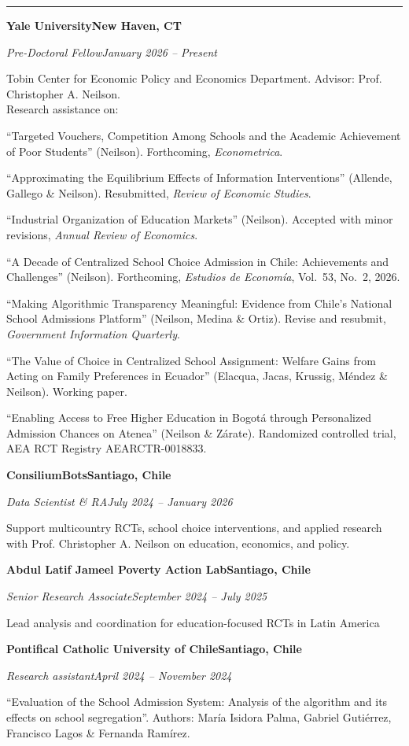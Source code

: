 \documentclass[11pt]{article}
\newcommand{\cvsection}[1]{\vspace{9pt}{\bfseries #1}\par\vspace{2pt}\hrule\vspace{6pt}}
\newcommand{\HL}[2]{\textbf{#1}\hfill\textbf{#2}\par}
\newcommand{\RL}[2]{\textit{#1}\hfill\textit{#2}\par}
\newcommand{\gap}{\vspace{7pt}}
\begin{document}
\cvsection{RESEARCH EXPERIENCE}

\HL{Yale University}{New Haven, CT}
\RL{Pre-Doctoral Fellow}{January 2026 -- Present}
Tobin Center for Economic Policy and Economics Department. Advisor: Prof. Christopher A. Neilson.\\
Research assistance on:
\begin{cvitems}
  \item ``Targeted Vouchers, Competition Among Schools and the Academic Achievement of Poor Students'' (Neilson). Forthcoming, \textit{Econometrica}.
  \item ``Approximating the Equilibrium Effects of Information Interventions'' (Allende, Gallego \& Neilson). Resubmitted, \textit{Review of Economic Studies}.
  \item ``Industrial Organization of Education Markets'' (Neilson). Accepted with minor revisions, \textit{Annual Review of Economics}.
  \item ``A Decade of Centralized School Choice Admission in Chile: Achievements and Challenges'' (Neilson). Forthcoming, \textit{Estudios de Economía}, Vol.~53, No.~2, 2026.
  \item ``Making Algorithmic Transparency Meaningful: Evidence from Chile's National School Admissions Platform'' (Neilson, Medina \& Ortiz). Revise and resubmit, \textit{Government Information Quarterly}.
  \item ``The Value of Choice in Centralized School Assignment: Welfare Gains from Acting on Family Preferences in Ecuador'' (Elacqua, Jacas, Krussig, Méndez \& Neilson). Working paper.
  \item ``Enabling Access to Free Higher Education in Bogotá through Personalized Admission Chances on Atenea'' (Neilson \& Zárate). Randomized controlled trial, AEA RCT Registry AEARCTR-0018833.
\end{cvitems}
\gap

\HL{ConsiliumBots}{Santiago, Chile}
\RL{Data Scientist \& RA}{July 2024 -- January 2026}
Support multicountry RCTs, school choice interventions, and applied research with Prof. Christopher A. Neilson on education, economics, and policy.
\gap

\HL{Abdul Latif Jameel Poverty Action Lab}{Santiago, Chile}
\RL{Senior Research Associate}{September 2024 -- July 2025}
Lead analysis and coordination for education-focused RCTs in Latin America
\gap

\HL{Pontifical Catholic University of Chile}{Santiago, Chile}
\RL{Research assistant}{April 2024 -- November 2024}
\begin{cvitems}
  \item ``Evaluation of the School Admission System: Analysis of the algorithm and its effects on school segregation''. Authors: María Isidora Palma, Gabriel Gutiérrez, Francisco Lagos \& Fernanda Ramírez.
\end{cvitems}
\gap
\end{document}
